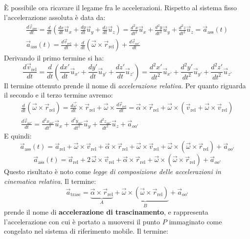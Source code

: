 \documentclass[10pt,a4paper]{book}
\begin{document}
È possibile ora ricavare il legame fra le accelerazioni. Rispetto al sistema fisso l'accelerazione assoluta è data da:
\begin{gather*}
	\frac{d\vec{v}_{\text{ass} }}{dt}=\frac{d}{dt}\left(\frac{dx}{dt} \vec{u}_x + \frac{dy}{dt} \vec{u}_y+ \frac{dz}{dt} \vec{u}_z\right)=\frac{d^2x}{dt^2} \vec{u}_x+ \frac{d^2y}{dt^2} \vec{u}_y+\frac{d^2z}{dt^2} \vec{u}_z=\vec{a}_{\text{ass}} (t) \\
	\vec{a}_{\text{ass}}(t)=\frac{d\vec{v}_{\text{rel}}}{dt}+\frac{d}{dt}(\vec{\omega} \times \vec{r}_{\text{rel}})+\frac{d\vec{v}_{oo'}}{dt}
\end{gather*}
Derivando il primo termine si ha:
\[
	\frac{d\vec{v}_{\text{rel}}}{dt}=\frac{d}{dt}\left(\frac{dx'}{dt}\vec{u}_{x'}+\frac{dy'}{dt}\vec{u}_{y'}+\frac{dz'}{dt}\vec{u}_{z'}\right)=\frac{d^2x'}{dt^2} \vec{u}_{x'} + \frac{d^2y'}{dt^2} \vec{u}_{y'}+ \frac{d^2z'}{dt^2} \vec{u}_{z'}
\]
Il termine ottenuto prende il nome di \emph{accelerazione relativa}. Per quanto riguarda il secondo e il terzo termine avremo:
\begin{gather*}
	\frac{d}{dt}(\vec{\omega} \times \vec{r}_{\text{rel}})=\frac{d\vec{\omega}}{dt} \times \vec{r}_{\text{rel}}+\vec{\omega} \times \frac{d\vec{r}_{\text{rel}} }{dt} = \vec{\alpha} \times \vec{r}_{\text{rel}}+\vec{\omega} \times( \vec{v}_{\text{rel}}+\vec{\omega} \times \vec{v}_{\text{rel}}) \\
	\frac{d\vec{v}_{oo'}}{dt}= \frac{d^2x_{oo'}}{dt^2} \vec{u}_x+ \frac{d^2y_{oo'}}{dt^2} \vec{u}_y+ \frac{d^2z_{oo'}}{dt^2} \vec{u}_z+\vec{a}_{oo'}
\end{gather*}
E quindi:
\[
	\vec{a}_{\text{ass}}(t)=\vec{a}_{\text{rel}} +\vec{\omega} \times \vec{v}_{\text{rel}}+\vec{\alpha}\times \vec{r}_{\text{rel}}+\vec{\omega} \times \vec{v}_{\text{rel}}+ \vec{\omega}\times({\vec{\omega}}\times \vec{r}_{\text{rel}})+\vec{a}_{oo'}
\]
\begin{equation}
	\boxed{\vec{a}_{\text{ass}}(t)=\vec{a}_{\text{rel}} +2\,\vec{\omega} \times \vec{v}_{\text{rel}}+\vec{\alpha}\times \vec{r}_{\text{rel}}+ \vec{\omega}\times({\vec{\omega}}\times \vec{r}_{\text{rel}})+\vec{a}_{oo'}}
\end{equation}
Questo risultato è noto come \emph{legge di composizione delle accelerazioni in cinematica relativa}. Il termine:
\[
	\vec{a}_{\text{trasc}}=\underbrace{\vec{\alpha}\times \vec{r}_{\text{rel}}}_A+ \underbrace{\vec{\omega}\times({\vec{\omega}}\times \vec{r}_{\text{rel}})}_B+\vec{a}_{oo'}
\]
prende il nome di \textbf{accelerazione di trascinamento}, e rappresenta l'accelerazione con cui è portato a muoversi il punto $P$ immaginato come congelato nel sistema di riferimento mobile. Il termine:
\end{document}
